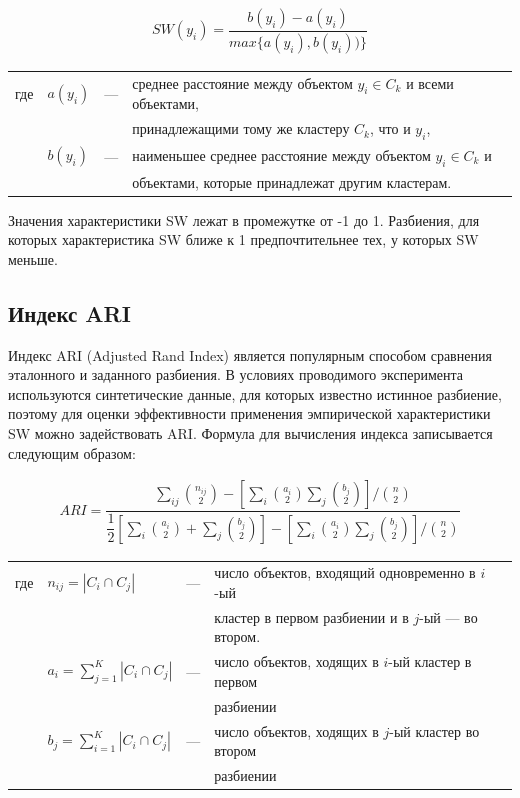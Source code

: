 \documentclass[12pt]{a&t}
\begin{document}
\begin{gather} \label{eq:sw}
SW(y_i) = \dfrac{b(y_i)-a(y_i)}{max\{a(y_i),b(y_i))\}}
\end{gather}

\begin{tabular}{llll}
	где & $ a(y_i) $ & {---} & среднее расстояние между объектом $ y_i \in C_k $ и всеми объектами, \\
	& & &	принадлежащими тому же кластеру $ C_k $, что и $ y_i $, \\
	& $ b(y_i) $ & {---} & наименьшее среднее расстояние между объектом $ y_i \in C_k $ и \\
	& & &  объектами, которые принадлежат другим кластерам. \\
\end{tabular}

Значения характеристики SW лежат в промежутке от -1 до 1. Разбиения, для которых характеристика SW ближе к 1 предпочтительнее тех, у которых SW меньше.

\subsection{Индекс ARI}\label{sec:ari}
Индекс ARI (Adjusted Rand Index) \cite{ARI-canonical} является популярным способом сравнения эталонного и заданного разбиения. В условиях проводимого эксперимента используются синтетические данные, для которых известно истинное разбиение, поэтому для оценки эффективности применения эмпирической характеристики SW можно задействовать ARI. Формула для вычисления индекса записывается следующим образом:

\begin{gather} \label{eq:ari}
ARI = \dfrac{\sum_{ij}\binom{n_{ij}}{2}-\left [ \sum_{i}\binom{a_{i}}{2}\sum_{j}\binom{b_{j}}{2} \right ]/\binom{n}{2}}{\dfrac{1}{2} \left [ \sum_i \binom{a_i}{2} + \sum_j \binom{b_j}{2} \right ] - \left [ \sum_i \binom{a_i}{2} \sum_j \binom{b_j}{2} \right ]/ \binom{n}{2}}
\end{gather}
 

\begin{tabular}{llll}
	где & $ n_{ij} = |C_i \cap C_j| $ & {---} & число объектов, входящий одновременно в $ i $-ый \\  
	& & &кластер в первом разбиении и в $ j $-ый --- во втором. \\
	& $ a_{i} = \sum_{j=1}^{K} |C_i \cap C_j| $ & {---} & число объектов, ходящих в $ i $-ый кластер в первом \\
	& & &разбиении\\
	& $ b_{j} = \sum_{i=1}^{K} |C_i \cap C_j| $ & {---} & число объектов, ходящих в $ j $-ый кластер во втором\\		
	& & & разбиении\\
\end{tabular}
\end{document}
